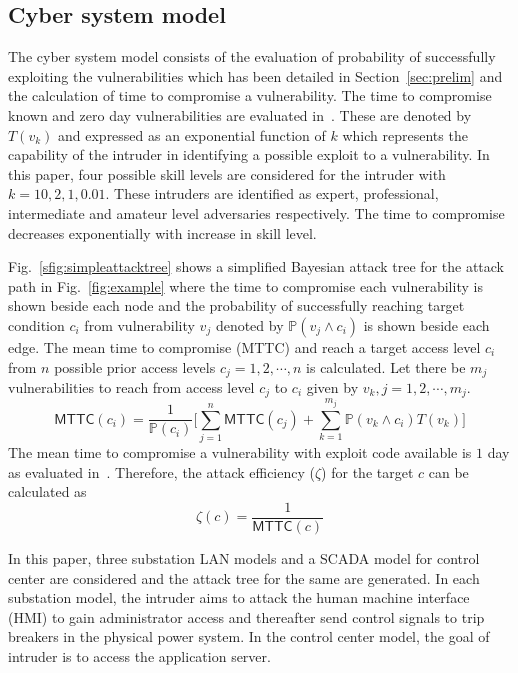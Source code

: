 \subsection{Cyber system model}\label{sec:cyber}
The cyber system model consists of the evaluation of probability of successfully exploiting the vulnerabilities which has been detailed in Section~\ref{sec:prelim} and the calculation of time to compromise a vulnerability. The time to compromise known and zero day vulnerabilities are evaluated in~\cite{mcqueen}. These are denoted by $T(v_k)$ and expressed as an exponential function of $k$ which represents the capability of the intruder in identifying a possible exploit to a vulnerability. In this paper, four possible skill levels are considered for the intruder with $k=10,2,1,0.01$. These intruders are identified as expert, professional, intermediate and amateur level adversaries respectively. The time to compromise decreases exponentially with increase in skill level.
 
Fig.~\ref{sfig:simpleattacktree} shows a simplified Bayesian attack tree for the attack path in Fig.~\ref{fig:example} where the time to compromise each vulnerability is shown beside each node and the probability of successfully reaching target condition $c_i$ from vulnerability $v_j$ denoted by $\mathbb{P}(v_j\wedge c_i)$ is shown beside each edge. The mean time to compromise (MTTC) and reach a target access level $c_i$ from $n$ possible prior access levels $c_j=1,2,\cdots,n$ is calculated. Let there be $m_j$ vulnerabilities to reach from access level $c_j$ to $c_i$ given by $v_k,j=1,2,\cdots,m_j$.
\begin{equation}
\mathsf{MTTC}(c_i)=\dfrac{1}{\mathbb{P}(c_i)}\bigg[\sum_{j=1}^{n}\mathsf{MTTC}(c_j)+\sum_{k=1}^{m_j}{\mathbb{P}(v_k\wedge c_i)T(v_k)}\bigg]
\end{equation}
The mean time to compromise a vulnerability with exploit code available is $1$ day as evaluated in~\cite{mcqueen}. Therefore, the attack efficiency ($\zeta$) for the target $c$ can be calculated as 
\begin{equation}
\zeta(c)=\dfrac{1}{\mathsf{MTTC}(c)}
\end{equation}

In this paper, three substation LAN models and a SCADA model for control center are considered and the attack tree for the same are generated. In each substation model, the intruder aims to attack the human machine interface (HMI) to gain administrator access and thereafter send control signals to trip breakers in the physical power system. In the control center model, the goal of intruder is to access the application server.

